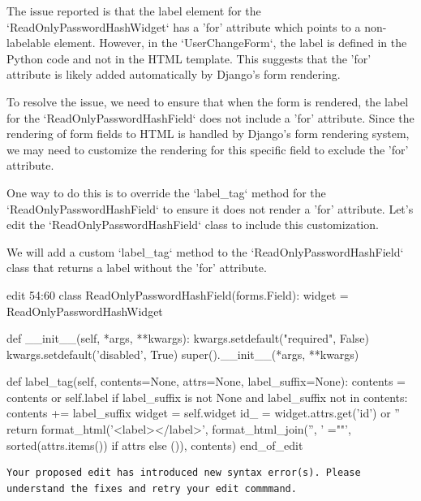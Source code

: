 {\begin{agentbox}
The issue reported is that the label element for the `ReadOnlyPasswordHashWidget` has a 'for' attribute which points to a non-labelable element. However, in the `UserChangeForm`, the label is defined in the Python code and not in the HTML template. This suggests that the 'for' attribute is likely added automatically by Django's form rendering.



To resolve the issue, we need to ensure that when the form is rendered, the label for the `ReadOnlyPasswordHashField` does not include a 'for' attribute. Since the rendering of form fields to HTML is handled by Django's form rendering system, we may need to customize the rendering for this specific field to exclude the 'for' attribute.



One way to do this is to override the `label\_tag` method for the `ReadOnlyPasswordHashField` to ensure it does not render a 'for' attribute. Let's edit the `ReadOnlyPasswordHashField` class to include this customization.



We will add a custom `label\_tag` method to the `ReadOnlyPasswordHashField` class that returns a label without the 'for' attribute.



\hrulefill
\begin{CodeVerbatim}[breaklines=true, breakanywhere=true]
edit 54:60
class ReadOnlyPasswordHashField(forms.Field):
    widget = ReadOnlyPasswordHashWidget

    def __init__(self, *args, **kwargs):
        kwargs.setdefault("required", False)
        kwargs.setdefault('disabled', True)
        super().__init__(*args, **kwargs)

    def label_tag(self, contents=None, attrs=None, label_suffix=None):
        contents = contents or self.label
        if label_suffix is not None and label_suffix not in contents:
            contents += label_suffix
        widget = self.widget
        id_ = widget.attrs.get('id') or ''
        return format_html('<label{}>{}</label>', format_html_join('', ' {}="{}"', sorted(attrs.items()) if attrs else ()), contents)
end_of_edit
\end{CodeVerbatim}
\end{agentbox}
\begin{observationbox}\begin{Verbatim}[breaklines=true, breakanywhere=true]
Your proposed edit has introduced new syntax error(s). Please understand the fixes and retry your edit commmand.


\end{Verbatim}
\end{observationbox}}
